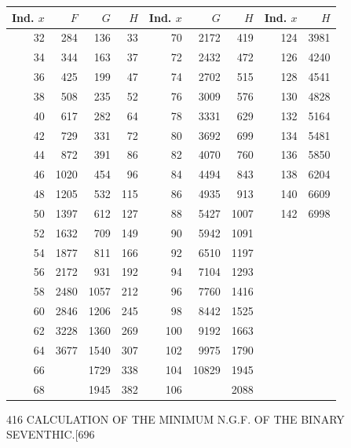 \documentclass[11pt]{article}
\begin{document}
\begin{center}\small
\begin{tabular}{r|rrr|r|rr|r|r}
\textbf{Ind. $x$} & $F$ & $G$ & $H$ & \textbf{Ind. $x$} & $G$ & $H$ & \textbf{Ind. $x$} & $H$ \\\hline
32 & 284  & 136  & 33  & 70  & 2172 & 419  & 124 & 3981 \\
34 & 344  & 163  & 37  & 72  & 2432 & 472  & 126 & 4240 \\
36 & 425  & 199  & 47  & 74  & 2702 & 515  & 128 & 4541 \\
38 & 508  & 235  & 52  & 76  & 3009 & 576  & 130 & 4828 \\
40 & 617  & 282  & 64  & 78  & 3331 & 629  & 132 & 5164 \\
42 & 729  & 331  & 72  & 80  & 3692 & 699  & 134 & 5481 \\
44 & 872  & 391  & 86  & 82  & 4070 & 760  & 136 & 5850 \\
46 & 1020 & 454  & 96  & 84  & 4494 & 843  & 138 & 6204 \\
48 & 1205 & 532  & 115 & 86  & 4935 & 913  & 140 & 6609 \\
50 & 1397 & 612  & 127 & 88  & 5427 & 1007 & 142 & 6998 \\
52 & 1632 & 709  & 149 & 90  & 5942 & 1091 &     &      \\
54 & 1877 & 811  & 166 & 92  & 6510 & 1197 &     &      \\
56 & 2172 & 931  & 192 & 94  & 7104 & 1293 &     &      \\
58 & 2480 & 1057 & 212 & 96  & 7760 & 1416 &     &      \\
60 & 2846 & 1206 & 245 & 98  & 8442 & 1525 &     &      \\
62 & 3228 & 1360 & 269 & 100 & 9192 & 1663 &     &      \\
64 & 3677 & 1540 & 307 & 102 & 9975 & 1790 &     &      \\
66 &      & 1729 & 338 & 104 & 10829& 1945 &     &      \\
68 &      & 1945 & 382 & 106 &      & 2088 &     &      \\
\end{tabular}
\end{center}

\clearpage
\begin{center}\small 416 \hfill CALCULATION OF THE MINIMUM N.G.F. OF THE BINARY SEVENTHIC.\hfill [696\end{center}
\end{document}

